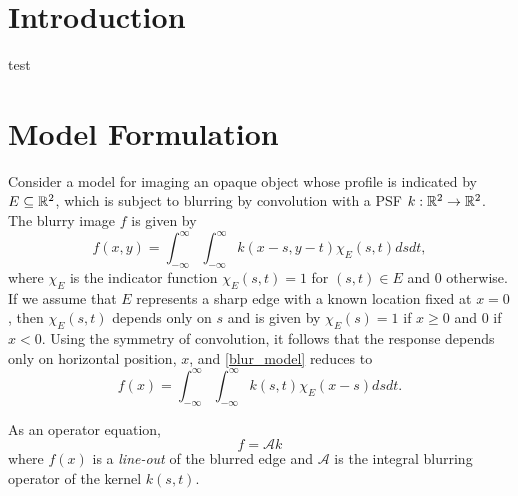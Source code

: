 \documentclass{amsart}
\theoremstyle{plain}
\begin{document}
\section{Introduction} \label{introduction}
test

\section{Model Formulation}
Consider a model for imaging an opaque object whose profile is indicated by $E \subseteq \mathbb R^2$, which is subject to blurring by convolution with a PSF $k:\mathbb R^2 \to \mathbb R^2$. 
The blurry image $f$ is given by
\begin{equation}
  f(x,y) = \int_{-\infty}^\infty\int_{-\infty}^\infty k(x-s,y-t)\chi_E(s,t)dsdt,
  \label{blur_model}
\end{equation}
where $\chi_E$ is the indicator function $\chi_E(s,t) = 1$ for $(s,t) \in E$ and 0 otherwise. 
If we assume that $E$ represents a sharp edge with a known location fixed at $x=0$, then $\chi_E(s,t)$ depends only on $s$ and is given by $\chi_E(s) = 1$ if $x\ge0$ and $0$ if $x <0$. 
Using the symmetry of convolution, it follows that the response depends only on horizontal position, $x$, and \eqref{blur_model} reduces to 
\begin{equation}
  f(x) 
  = \int_{-\infty}^\infty\int_{-\infty}^\infty k(s,t)\chi_E(x-s)dsdt \label{blur_model2}.
\end{equation}


As an operator equation,
\begin{equation}
  f = \mathcal A k \label{operator1}
\end{equation}
where $f(x)$ is a \emph{line-out} of the blurred edge and $\mathcal A$ is the integral blurring operator of the kernel $k(s,t)$.
\end{document}
